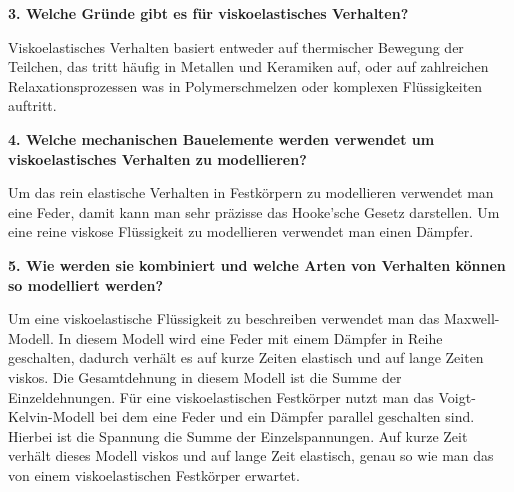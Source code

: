 \noindent\textbf{3. Welche Gründe gibt es für viskoelastisches Verhalten?}\\
\begin{addmargin}[25pt]{0pt}
Viskoelastisches Verhalten basiert entweder auf thermischer Bewegung der Teilchen, das tritt häufig in Metallen und Keramiken auf, oder auf zahlreichen Relaxationsprozessen was in Polymerschmelzen oder komplexen Flüssigkeiten auftritt. \\
\end{addmargin}

\noindent\textbf{4. Welche mechanischen Bauelemente werden verwendet um viskoelastisches Verhalten zu modellieren?}\\
\begin{addmargin}[25pt]{0pt}
Um das rein elastische Verhalten in Festkörpern zu modellieren verwendet man eine Feder, damit kann man sehr präzisse das Hooke'sche Gesetz darstellen. Um eine reine viskose Flüssigkeit zu modellieren verwendet man einen Dämpfer.\\
\end{addmargin}

\noindent\textbf{5. Wie werden sie kombiniert und welche Arten von Verhalten können so modelliert werden?}\\
\begin{addmargin}[25pt]{0pt}
Um eine viskoelastische Flüssigkeit zu beschreiben verwendet man das Maxwell-Modell. In diesem Modell wird eine Feder mit einem Dämpfer in Reihe geschalten, dadurch verhält es auf kurze Zeiten elastisch und auf lange Zeiten viskos. Die Gesamtdehnung in diesem Modell ist die Summe der Einzeldehnungen. Für eine viskoelastischen Festkörper nutzt man das Voigt-Kelvin-Modell bei dem eine Feder und ein Dämpfer parallel geschalten sind. Hierbei ist die Spannung die Summe der Einzelspannungen. Auf kurze Zeit verhält dieses Modell viskos und auf lange Zeit elastisch, genau so wie man das von einem viskoelastischen Festkörper erwartet.\\
\end{addmargin}


